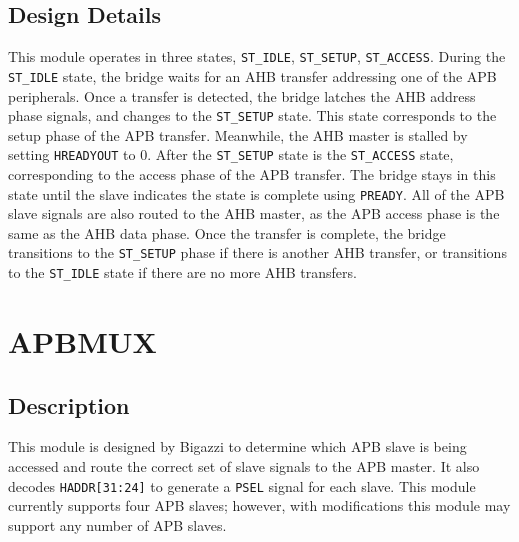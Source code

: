 \subsection{Design Details}
This module operates in three states, \texttt{ST\_IDLE}, \texttt{ST\_SETUP}, \texttt{ST\_ACCESS}. During the \texttt{ST\_IDLE} state, the bridge waits for an AHB transfer addressing one of the APB peripherals. Once a transfer is detected, the bridge latches the AHB address phase signals, and changes to the \texttt{ST\_SETUP} state. This state corresponds to the setup phase of the APB transfer. Meanwhile, the AHB master is stalled by setting \texttt{HREADYOUT} to 0. After the \texttt{ST\_SETUP} state is the \texttt{ST\_ACCESS} state, corresponding to the access phase of the APB transfer. The bridge stays in this state until the slave indicates the state is complete using \texttt{PREADY}. All of the APB slave signals are also routed to the AHB master, as the APB access phase is the same as the AHB data phase. Once the transfer is complete, the bridge transitions to the \texttt{ST\_SETUP} phase if there is another AHB transfer, or transitions to the \texttt{ST\_IDLE} state if there are no more AHB transfers.

\section{APBMUX}
\subsection{Description}
This module is designed by Bigazzi to determine which APB slave is being accessed and route the correct set of slave signals to the APB master. It also decodes \texttt{HADDR[31:24]} to generate a \texttt{PSEL} signal for each slave. This module currently supports four APB slaves; however, with modifications this module may support any number of APB slaves.

